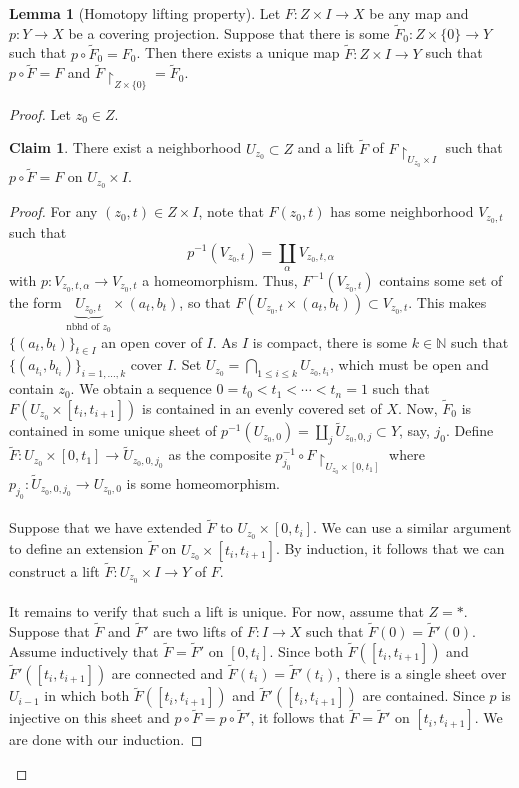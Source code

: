 \documentclass[10pt,letterpaper,cm]{nupset}
\theoremstyle{definition}
\theoremstyle{theorem}
\newtheorem{lemma}[definition]{Lemma}
\newtheorem*{claim}{Claim}
\theoremstyle{remark}
\newcommand{\N}{\mathbb N}
\newcommand{\1}{\mathbb{1}}
\newcommand{\0}{\vec 0}
\begin{document}
\begin{lemma}[Homotopy lifting property]
Let $F : Z \times I \to X$ be any map and $p: Y \to X$ be a covering projection. Suppose that there is some $\widetilde{F}_0 : Z \times \{0\} \to Y$ such that $p \circ \widetilde{F}_0 = F_0$. Then there exists a unique map $\widetilde{F} : Z \times I \to Y$ such that $p \circ \widetilde{F} = F$ and $\widetilde{F} \restriction_{Z\times \{0\}} = \widetilde{F}_0$.
\end{lemma}
\begin{proof}
Let $z_0\in Z$.
\begin{claim} There exist a neighborhood $U_{z_0}\subset Z$ and a lift $\widetilde{F}$ of $F\restriction_{U_{z_0}\times I}$ such that $p \circ \widetilde{F} = F$ on $U_{z_0}\times I$.
\end{claim}
\begin{proof}
For any $(z_0, t) \in Z \times I$, note that $F(z_0, t)$ has some neighborhood $V_{z_0,t}$ such that $$p^{-1}(V_{z_0, t}) = \coprod_{\alpha} V_{z_0,t, \alpha}$$ with $p: V_{z_0, t, \alpha} \to V_{z_0, t}$ a homeomorphism. Thus, $F^{-1}(V_{z_0, t})$ contains some set of the form $\underbrace{U_{z_0, t}}_{\text{nbhd of } z_0} \times (a_t, b_t)$, so that $F(U_{z_0, t}  \times (a_t, b_t)) \subset V_{z_0, t} $. This makes $\{(a_t, b_t)\}_{t\in I}$ an open cover of $I$. As $I$ is compact, there is some $k\in \N$ such that $\{(a_{t_i}, b_{t_i})\}_{i=1, \ldots, k}$  cover $I$. Set $U_{z_0} = \bigcap_{1\leq i \leq k} U_{z_0, t_i}$, which must be  open and contain $z_0$. We obtain a sequence $ 0= t_0 < t_1 < \cdots < t_n =1 $ such that $F(U_{z_0} \times [t_i, t_{i+1}])$ is contained in an evenly covered set of $X$. 
Now, $\widetilde{F}_0 $ is contained in some unique sheet of $p^{-1}(U_{z_0, 0}) =\coprod_j \widetilde{U}_{z_0, 0, j} \subset Y$, say, $j_0$. Define $\widetilde{F} : U_{z_0} \times [0, t_1] \to \widetilde{U}_{z_0, 0, j_0}$ as the composite $p^{-1}_{j_0} \circ F \restriction_{U_{z_0} \times [0, t_1]}$ where $p_{j_0} : \widetilde{U}_{z_0, 0, j_0} \to U_{z_0, 0}$ is some homeomorphism.
\\ \\ Suppose that we have extended $\widetilde{F}$ to $U_{z_0} \times [0,t_i]$. We can use a similar argument to define an extension $\widetilde{F}$ on $U_{z_0} \times [t_i, t_{i+1}]$.  By induction, it follows that we can construct a lift $\tilde{F} : U_{z_0} \times I \to Y$ of $F$.
\\ \\ It remains to verify that such a lift is unique. For now, assume that $Z= \ast$. Suppose that $\widetilde{F}$ and $\widetilde{F}'$ are two lifts of $F: I \to X$ such that $\widetilde{F}(0) = \widetilde{F}'(0)$. Assume inductively that $\widetilde{F} = \widetilde{F}'$ on $[0,t_i]$. Since both $\widetilde{F}([t_i, t_{i+1}])$ and $\widetilde{F}'([t_i, t_{i+1}])$ are connected and $\widetilde{F}(t_i) = \widetilde{F}'(t_i)$, there is a single sheet over $U_{i-1}$ in which both $\widetilde{F}([t_i, t_{i+1}])$ and $\widetilde{F}'([t_i, t_{i+1}])$ are contained. Since $p$ is injective on this sheet and $p\circ \widetilde{F} = p \circ \widetilde{F}'$, it follows that $\widetilde{F} = \widetilde{F}'$ on $[t_i, t_{i+1}]$. We are done with our induction.

\end{proof}
\end{proof}
\end{document}
